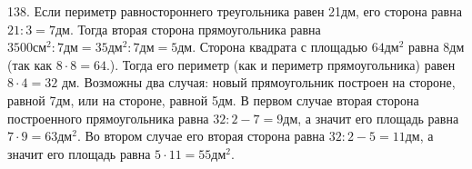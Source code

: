 138. Если периметр равностороннего треугольника равен 21дм, его сторона равна $21:3=7\text{дм}.$ Тогда вторая сторона прямоугольника равна $3500\text{см}^2:7\text{дм}=35\text{дм}^2:7\text{дм}=5\text{дм}$. Сторона квадрата с площадью $64\text{дм}^2$ равна 8дм (так как $8\cdot8=64.$). Тогда его периметр (как и периметр прямоугольника) равен $8\cdot4=32$ дм. Возможны два случая: новый прямоугольник построен на стороне, равной 7дм, или на стороне, равной 5дм. В первом случае вторая сторона построенного прямоугольника равна $32:2-7=9$дм, а значит его площадь равна $7\cdot9=63\text{дм}^2.$ Во втором случае его вторая сторона равна $32:2-5=11$дм, а значит его площадь равна $5\cdot11=55\text{дм}^2.$\\
